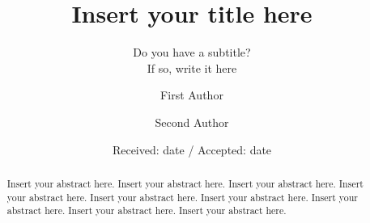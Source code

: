 \documentclass[pdftex,twocolumn,epjc3]{svjour3}          %
\begin{document}
\title{Insert your title here}

\subtitle{Do you have a subtitle?\\ If so, write it here}

\author{First Author
        \and
        Second Author %
}



\date{Received: date / Accepted: date}


\maketitle

\begin{abstract}
Insert your abstract here. Insert your abstract here. Insert your abstract here.
Insert your abstract here. Insert your abstract here. Insert your abstract here.
Insert your abstract here. Insert your abstract here. Insert your abstract here.
\end{abstract}



\begin{thebibliography}{9}

\end{thebibliography}
\end{document}
